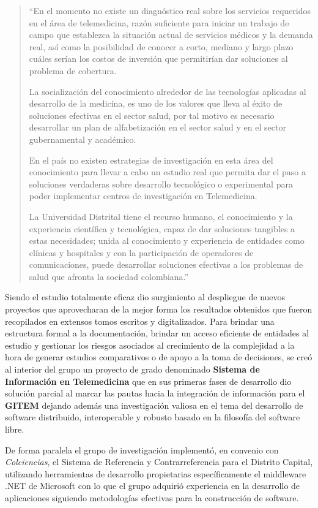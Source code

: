 \begin{quote}
“En el momento no existe un diagnóstico real sobre los servicios requeridos en el área de telemedicina, razón suficiente para iniciar un trabajo de campo que establezca la situación actual de servicios médicos y la demanda real, así como la posibilidad de conocer a corto, mediano y largo plazo cuáles serían los costos de inversión que permitirían dar soluciones al problema  de cobertura.

La socialización del conocimiento alrededor de las tecnologías aplicadas al desarrollo de la medicina, es uno de los valores que lleva al éxito de soluciones efectivas en el sector salud, por tal motivo es necesario desarrollar un plan de alfabetización en el sector salud y en el sector gubernamental y académico.

En el país no existen estrategias de investigación en esta área del conocimiento para llevar a cabo un estudio real que permita dar el paso a soluciones verdaderas sobre desarrollo tecnológico o experimental para poder implementar centros de investigación en Telemedicina.

La Universidad Distrital tiene el recurso humano, el conocimiento y la experiencia científica y tecnológica, capaz de dar soluciones tangibles a estas necesidades; unida al conocimiento y experiencia de entidades como clínicas y hospitales  y con la participación de operadores de comunicaciones, puede desarrollar soluciones efectivas a los problemas de salud que afronta la sociedad colombiana.”
\end{quote}

Siendo el estudio totalmente eficaz dio surgimiento al despliegue de nuevos proyectos que aprovecharan de la mejor forma los resultados obtenidos que fueron recopilados en extensos tomos escritos y digitalizados. Para brindar una estructura formal a la documentación, brindar un acceso eficiente de entidades al estudio y gestionar los riesgos asociados al crecimiento de la complejidad a la hora de generar estudios comparativos o de apoyo a la toma de decisiones, se creó al interior del grupo un proyecto de grado denominado \textbf{Sistema de Información en Telemedicina} que en sus primeras fases de desarrollo dio solución parcial al marcar las pautas hacia la integración de información para el \textbf{GITEM} dejando además una investigación valiosa en el tema del desarrollo de software distribuido, interoperable y robusto basado en la filosofía del software libre.

De forma paralela el grupo de investigación implementó, en convenio con \textit{Colciencias}, el Sistema de Referencia y Contrarreferencia para el Distrito Capital, utilizando herramientas de desarrollo propietarias específicamente el middleware .NET de Microsoft con lo que el grupo adquirió experiencia en la desarrollo de aplicaciones siguiendo metodologías efectivas para la construcción de software.

